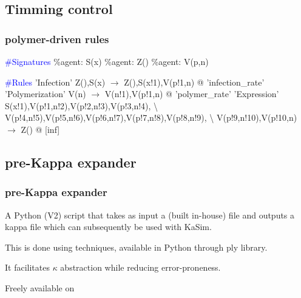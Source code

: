 \documentclass[xcolor=dvipsnames]{beamer}
\begin{document}
\subsection{Timming control}
\begin{frame}
  \frametitle{polymer-driven rules}
  \begin{flushleft}
    \textcolor{blue}{\#Signatures} \newline
    \%agent: S(x) \newline
    \%agent: Z() \newline
    \%agent: V(p,n) \pause
    \item \textcolor{blue}{\#Rules} \newline
    'Infection' Z(),S(x) $\rightarrow$ Z(),S(x!1),V(p!1,n) @ 'infection\_rate' \newline \pause
    'Polymerization' V(n) $\rightarrow$ V(n!1),V(p!1,n) @ 'polymer\_rate' \newline \pause
    'Expression' S(x!1),V(p!1,n!2),V(p!2,n!3),V(p!3,n!4), \textbackslash \newline
    V(p!4,n!5),V(p!5,n!6),V(p!6,n!7),V(p!7,n!8),V(p!8,n!9), \textbackslash \newline
    V(p!9,n!10),V(p!10,n) $\rightarrow$ Z() @ [inf]
  \end{flushleft}
\end{frame}

\subsection{pre-Kappa expander}
\begin{frame}
  \frametitle{pre-Kappa expander}
  \begin{flushleft}
    A Python (V2) script that takes as input a (built in-house)  file and outputs a kappa file which can subsequently be used with KaSim. \pause
    \item This is done using  techniques, available in Python through ply library. \pause
    \item It facilitates $\kappa$ abstraction while reducing error-proneness. \pause
    \item Freely available on 
  \end{flushleft}
\end{frame}
\end{document}
